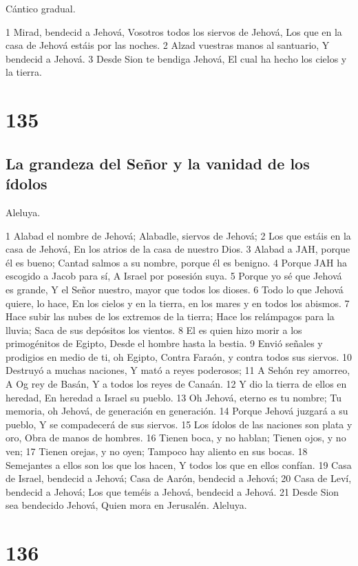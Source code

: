 Cántico gradual.

1 Mirad, bendecid a Jehová,
Vosotros todos los siervos de Jehová,
Los que en la casa de Jehová estáis por las noches.
2 Alzad vuestras manos al santuario,
Y bendecid a Jehová.
3 Desde Sion te bendiga Jehová,
El cual ha hecho los cielos y la tierra.

\chapter{135}

\section*{La grandeza del Señor y la vanidad de los ídolos}

Aleluya.

1 Alabad el nombre de Jehová;
Alabadle, siervos de Jehová;
2 Los que estáis en la casa de Jehová,
En los atrios de la casa de nuestro Dios.
3 Alabad a JAH, porque él es bueno;
Cantad salmos a su nombre, porque él es benigno.
4 Porque JAH ha escogido a Jacob para sí,
A Israel por posesión suya.
5 Porque yo sé que Jehová es grande,
Y el Señor nuestro, mayor que todos los dioses.
6 Todo lo que Jehová quiere, lo hace,
En los cielos y en la tierra, en los mares y en todos los abismos.
7 Hace subir las nubes de los extremos de la tierra;
Hace los relámpagos para la lluvia;
Saca de sus depósitos los vientos.
8 El es quien hizo morir a los primogénitos de Egipto,
Desde el hombre hasta la bestia.
9 Envió señales y prodigios en medio de ti, oh Egipto,
Contra Faraón, y contra todos sus siervos.
10 Destruyó a muchas naciones,
Y mató a reyes poderosos;
11 A Sehón rey amorreo,
A Og rey de Basán,
Y a todos los reyes de Canaán.
12 Y dio la tierra de ellos en heredad,
En heredad a Israel su pueblo.
13 Oh Jehová, eterno es tu nombre;
Tu memoria, oh Jehová, de generación en generación.
14 Porque Jehová juzgará a su pueblo,
Y se compadecerá de sus siervos.
15 Los ídolos de las naciones son plata y oro,
Obra de manos de hombres.
16 Tienen boca, y no hablan;
Tienen ojos, y no ven;
17 Tienen orejas, y no oyen;
Tampoco hay aliento en sus bocas.
18 Semejantes a ellos son los que los hacen,
Y todos los que en ellos confían.
19 Casa de Israel, bendecid a Jehová;
Casa de Aarón, bendecid a Jehová;
20 Casa de Leví, bendecid a Jehová;
Los que teméis a Jehová, bendecid a Jehová.
21 Desde Sion sea bendecido Jehová,
Quien mora en Jerusalén.
Aleluya.

\chapter{136}

